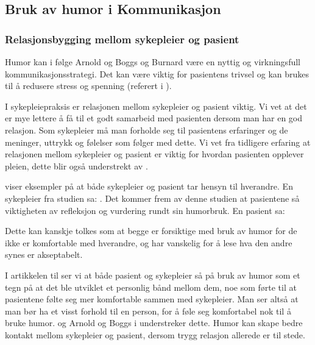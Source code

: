 \subsection{Bruk av humor i Kommunikasjon}

\subsubsection{Relasjonsbygging mellom sykepleier og pasient}
\label{disk.relbygg}

Humor kan i følge Arnold og Boggs og Burnard være en nyttig og virkningsfull
kommunikasjonsstrategi. Det kan være viktig for pasientens trivsel og kan
brukes til å redusere stress og spenning (referert i ).

I sykepleiepraksis er relasjonen mellom sykepleier og pasient viktig. Vi vet at
det er mye lettere å få til et godt samarbeid med pasienten dersom man har en
god relasjon. Som sykepleier må man forholde seg til pasientens erfaringer og
de meninger, uttrykk og følelser som følger med dette. Vi vet fra tidligere
erfaring at relasjonen mellom sykepleier og pasient er viktig for hvordan
pasienten opplever pleien, dette blir også understrekt av .

 viser eksempler på at både sykepleier og pasient tar hensyn
til hverandre. En sykepleier fra studien sa:
. Det kommer frem av denne studien at pasientene så viktigheten av
refleksjon og vurdering rundt sin humorbruk. En pasient sa:

Dette kan kanskje tolkes som at begge er forsiktige med bruk av humor for de
ikke er komfortable med hverandre, og har vanskelig for å lese hva den andre
synes er akseptabelt.

I artikkelen til  ser vi at både pasient og sykepleier så på
bruk av humor som et tegn på at det ble utviklet et personlig bånd mellom dem,
noe som førte til at pasientene følte seg mer komfortable sammen med
sykepleier. Man ser altså at man bør ha et visst forhold til en person, for å
føle seg komfortabel nok til å bruke humor.  og Arnold
og Boggs i  understreker dette. Humor kan skape bedre kontakt
mellom sykepleier og pasient, dersom trygg relasjon allerede er til stede.

